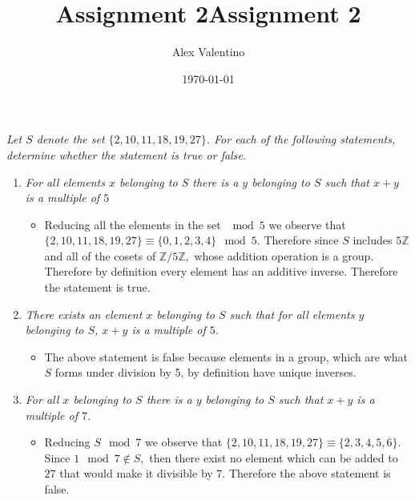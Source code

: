 \documentclass[12pt, letterpaper]{article}
\date{\today}
\title{Assignment 2}
\author{Alex Valentino}
\title{Assignment 2}
\newcommand{\Z}{\mathbb{Z}}
\begin{document}
	\textit{Let $S$ denote the set $\{2, 10, 11, 18, 19, 27\}$.
For each of the following statements, determine whether the statement is true or false.}
\begin{enumerate}
	\item \textit{For all elements $x$ belonging to $S$ there is a $y$ belonging to $S$ such that $x + y$ is a multiple
of $5$}
	\begin{itemize}
		\item Reducing all the elements in the set $\mod 5$ we observe that $\{2, 10, 11, 18, 19, 27\} \equiv \{0,1,2,3,4\} \mod 5.$  Therefore since $S$ includes $5\Z$ and all of the cosets of $\Z / 5 \Z,$ whose addition operation is a group.  Therefore by definition every element has an additive inverse.  Therefore the statement is true. 
	\end{itemize}
	\item \textit{There exists an element $x$ belonging to $S$ such that for all elements $y$ belonging to $S$,
$x + y$ is a multiple of $5$.}
	\begin{itemize}
		\item The above statement is false because elements in a group, which are what $S$ forms under division by 5, by definition have unique inverses. 
	\end{itemize}
	\item \textit{For all $x$ belonging to $S$ there is a $y$ belonging to $S$ such that $x + y$ is a multiple of $7$.}
	\begin{itemize}
		\item Reducing $S \mod 7$ we observe that $\{2, 10, 11, 18, 19, 27\} \equiv \{2,3,4,5,6\}.$  Since $1 \mod 7 \notin S, $ then there exist no element which can be added to $27$ that would make it divisible by $7$.  Therefore the above statement is false. 
	\end{itemize}
\end{enumerate}
\end{document}
